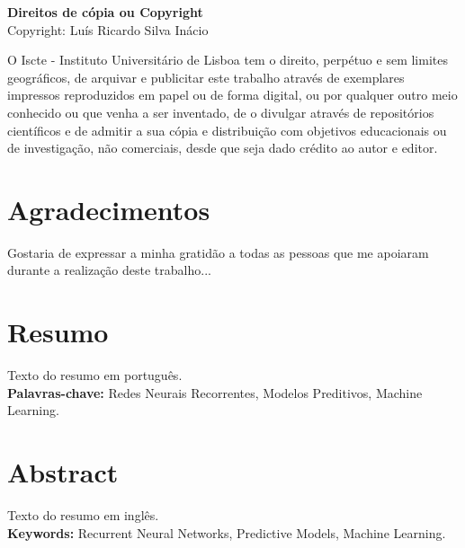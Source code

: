 \documentclass[a4paper,12pt]{report}
\begin{document}
	\newpage
	\thispagestyle{empty}
	\noindent %
	{\footnotesize %
		\textbf{Direitos de cópia ou Copyright} \\ %
		\textcopyright
		Copyright: Luís Ricardo Silva Inácio \\[-0.5cm] %
		\begin{flushleft} %
			\renewcommand{\baselinestretch}{1}\selectfont %
			\justify %
			O Iscte - Instituto Universitário de Lisboa tem o direito, perpétuo e sem limites geográficos, de arquivar e publicitar este trabalho através de exemplares impressos reproduzidos em papel ou de forma digital, ou por qualquer outro meio conhecido ou que venha a ser inventado, de o divulgar através de repositórios científicos e de admitir a sua cópia e distribuição com objetivos educacionais ou de investigação, não comerciais, desde que seja dado crédito ao autor e editor.
		\end{flushleft}
	}
	\newpage
	
	\chapter*{Agradecimentos}
	Gostaria de expressar a minha gratidão a todas as pessoas que me apoiaram durante a realização deste trabalho...
	
	\newpage
	\chapter*{Resumo}
	Texto do resumo em português. \\[1em]
	\textbf{Palavras-chave:} Redes Neurais Recorrentes, Modelos Preditivos, Machine Learning.
	\newpage
	
	\chapter*{Abstract}
	Texto do resumo em inglês. \\[1em]
	\textbf{Keywords:} Recurrent Neural Networks, Predictive Models, Machine Learning.
	\newpage
	
	\tableofcontents
	\newpage
	\listoffigures
	\newpage
	\listoftables
	\newpage
	
\end{document}
